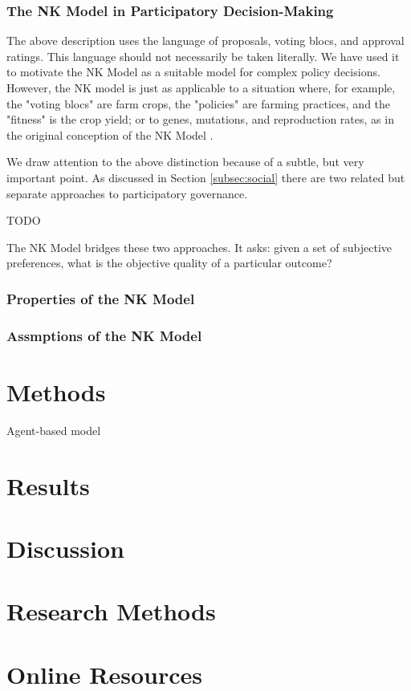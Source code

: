 \documentclass[manuscript,screen,review,acmsmall]{acmart}
\begin{document}
\subsubsection{The NK Model in Participatory Decision-Making}
The above description uses the language of proposals, voting blocs, and approval ratings. This language should not necessarily be taken literally.
We have used it to motivate the NK Model as a suitable model for complex policy decisions.
However, the NK model is just as applicable to a situation where, for example, the "voting blocs" are farm crops, the "policies" are farming practices, and the "fitness" is the crop yield; or to genes, mutations, and reproduction rates, as in the original conception of the NK Model \cite{kauffman_towards_1987}.

We draw attention to the above distinction because of a subtle, but very important point.
As discussed in Section \ref{subsec:social} there are two related but separate approaches to participatory governance.

TODO

The NK Model bridges these two approaches.
It asks: given a set of subjective preferences,
what is the objective quality of a particular outcome?

\subsubsection{Properties of the NK Model}

\subsubsection{Assmptions of the NK Model}

\section{Methods\label{sec:methods}}
Agent-based model



\section{Results}

\section{Discussion}


\begin{acks}

\end{acks}




\appendix

\section{Research Methods}

\section{Online Resources}
\end{document}
